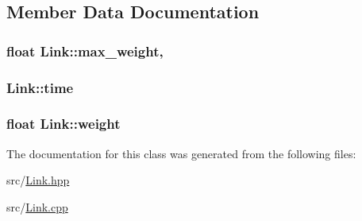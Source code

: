 \subsection{Member Data Documentation}
\hypertarget{class_link_af1f0e693d5e0f5f8cf39947d09c84251}{
\subsubsection[{max\+\_\+weight}]{\setlength{\rightskip}{0pt plus 5cm}float Link\+::max\+\_\+weight\hspace{0.3cm}{\ttfamily [static]}, {\ttfamily [private]}}}\label{class_link_af1f0e693d5e0f5f8cf39947d09c84251}
\hypertarget{class_link_acb992140e3cf154c36fd94ab8184e00e}{
\subsubsection[{time}]{ Link\+::time\hspace{0.3cm}{\ttfamily [private]}}}\label{class_link_acb992140e3cf154c36fd94ab8184e00e}
\hypertarget{class_link_a61f8b4a76aa028011dbe75affc1b44f7}{
\subsubsection[{weight}]{\setlength{\rightskip}{0pt plus 5cm}float Link\+::weight\hspace{0.3cm}{\ttfamily [private]}}}\label{class_link_a61f8b4a76aa028011dbe75affc1b44f7}


The documentation for this class was generated from the following files\+:\begin{DoxyCompactItemize}
\item 
src/\hyperlink{_link_8hpp}{Link.\+hpp}\item 
src/\hyperlink{_link_8cpp}{Link.\+cpp}\end{DoxyCompactItemize}
